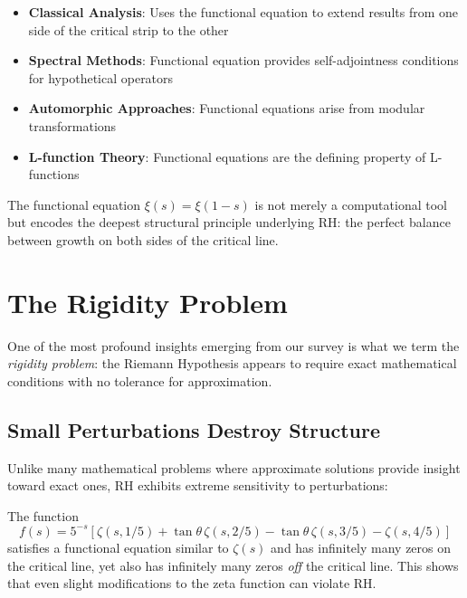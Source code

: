 \begin{itemize}
\item \textbf{Classical Analysis}: Uses the functional equation to extend results from one side of the critical strip to the other
\item \textbf{Spectral Methods}: Functional equation provides self-adjointness conditions for hypothetical operators  
\item \textbf{Automorphic Approaches}: Functional equations arise from modular transformations
\item \textbf{L-function Theory}: Functional equations are the defining property of L-functions
\end{itemize}

The functional equation $\xi(s) = \xi(1-s)$ is not merely a computational tool but encodes the deepest structural principle underlying RH: the perfect balance between growth on both sides of the critical line.

\section{The Rigidity Problem}
\label{sec:rigidity}

One of the most profound insights emerging from our survey is what we term the \emph{rigidity problem}: the Riemann Hypothesis appears to require exact mathematical conditions with no tolerance for approximation.

\subsection{Small Perturbations Destroy Structure}
\label{subsec:perturbations}

Unlike many mathematical problems where approximate solutions provide insight toward exact ones, RH exhibits extreme sensitivity to perturbations:

\begin{example}
The function
\begin{equation}
f(s) = 5^{-s}[\zeta(s,1/5) + \tan\theta\,\zeta(s,2/5) - \tan\theta\,\zeta(s,3/5) - \zeta(s,4/5)]
\end{equation}
satisfies a functional equation similar to $\zeta(s)$ and has infinitely many zeros on the critical line, yet also has infinitely many zeros \emph{off} the critical line. This shows that even slight modifications to the zeta function can violate RH.
\end{example}

